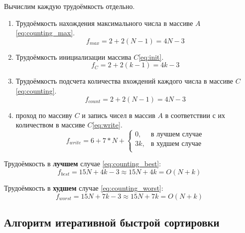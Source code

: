 Вычислим каждую трудоёмкость отдельно.

\begin{enumerate}
    \item Трудоёмкость нахождения максимального числа в массиве $A$\eqref{eq:counting_max}.
    \begin{equation}
        \label{eq:counting_max}
        f_{max} = 2 + 2(N - 1) = 4N - 3
    \end{equation}
    \item Трудоёмкость инициализации массива $C$\eqref{eq:init}.
    \begin{equation}
        \label{eq:init}
        f_{C} = 2 + 2(k - 1) = 4k - 3
    \end{equation}
    \item Трудоёмкость подсчета количества вхождений каждого числа в массиве $C$\eqref{eq:counting}.
    \begin{equation}
        \label{eq:counting}
        f_{count} = 2 + 2(N - 1) = 4N - 3
    \end{equation}
    \item проход по массиву $C$ и запись чисел в массив $A$ в соответствии с их количеством в массиве $C$\eqref{eq:write}.
    \begin{equation}
        \label{eq:write}
        f_{write} = 6 + 7 * N + \begin{cases}
                            0, & \text{в лучшем случае}\\
                            3k, & \text{в худшем случае}\\
        \end{cases}
    \end{equation}
\end{enumerate}

Трудоёмкость в \textbf{лучшем} случае \eqref{eq:counting_best}:
\begin{equation}
    \label{eq:counting_best}
    f_{best} = 15N + 4k - 3 \approx 15N + 4k = O(N + k)
\end{equation}

Трудоёмкость в \textbf{худшем} случае \eqref{eq:counting_worst}:
\begin{equation}
    \label{eq:counting_worst}
    f_{worst} = 15N + 7k - 3 \approx 15N + 7k = O(N + k)
\end{equation}

\subsection{Алгоритм итеративной быстрой сортировки}

